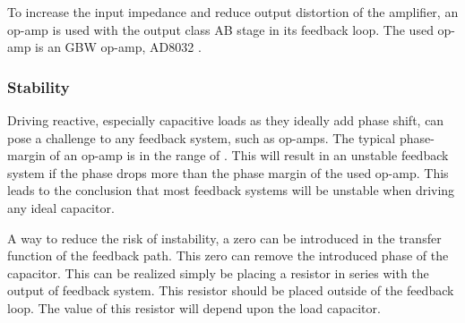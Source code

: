 To increase the input impedance and reduce output distortion of the amplifier, an op-amp is used with the output class AB stage in its feedback loop. The used op-amp is an  GBW op-amp, AD8032 \cite{AD8032_datasheet}. 

\subsubsection{Stability}
Driving reactive, especially capacitive loads as they ideally add  phase shift, can pose a challenge to any feedback system, such as op-amps. The typical phase-margin of an op-amp is in the range of . This will result in an unstable feedback system if the phase drops more than the phase margin of the used op-amp. This leads to the conclusion that most feedback systems will be unstable when driving any ideal capacitor.

A way to reduce the risk of instability, a zero can be introduced in the transfer function of the feedback path. This zero can remove the introduced  phase of the capacitor. This can be realized simply be placing a resistor in series with the output of feedback system. This resistor should be placed outside of the feedback loop. The value of this resistor will depend upon the load capacitor.